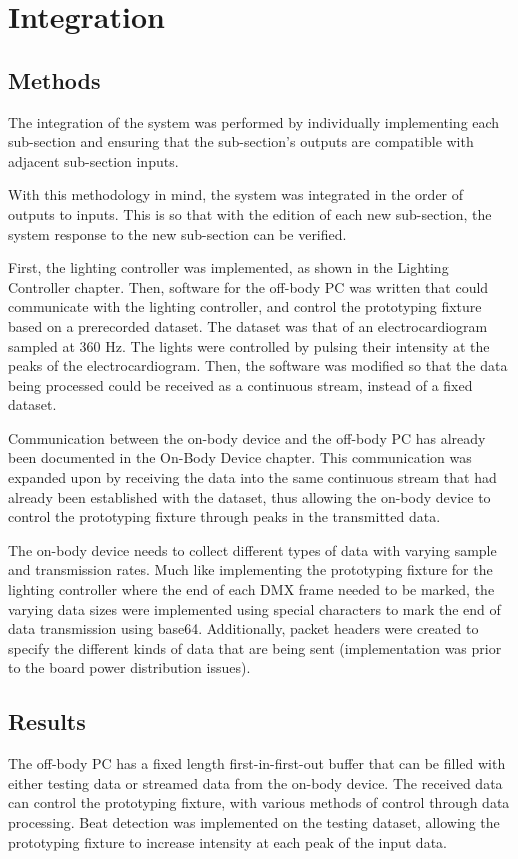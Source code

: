 \chapter{Integration}
\section{Methods}
The integration of the system was performed by individually implementing each sub-section
and ensuring that the sub-section's outputs are compatible with adjacent sub-section inputs.

With this methodology in mind, the system was integrated in the order of outputs to inputs.
This is so that with the edition of each new sub-section, the system response to the new sub-section can be verified.

First, the lighting controller was implemented, as shown in the Lighting Controller chapter.
Then, software for the off-body PC was written that could communicate with the lighting controller,
and control the prototyping fixture based on a prerecorded dataset.
The dataset was that of an electrocardiogram sampled at 360 Hz.
The lights were controlled by pulsing their intensity at the peaks of the electrocardiogram.
Then, the software was modified so that the data being processed could be received as a continuous stream, instead of a fixed dataset.

Communication between the on-body device and the off-body PC has already been documented in the On-Body Device chapter.
This communication was expanded upon by receiving the data into the same continuous stream that had already been established with the dataset,
thus allowing the on-body device to control the prototyping fixture through peaks in the transmitted data.

The on-body device needs to collect different types of data with varying sample and transmission rates.
Much like implementing the prototyping fixture for the lighting controller where the end of each DMX frame needed to be marked,
the varying data sizes were implemented using special characters to mark the end of data transmission using base64.
Additionally, packet headers were created to specify the different kinds of data that are being sent
(implementation was prior to the board power distribution issues).


\section{Results}
The off-body PC has a fixed length first-in-first-out buffer that can be filled with either testing data or streamed data from the on-body device.
The received data can control the prototyping fixture, with various methods of control through data processing.
Beat detection was implemented on the testing dataset,
allowing the prototyping fixture to increase intensity at each peak of the input data.

